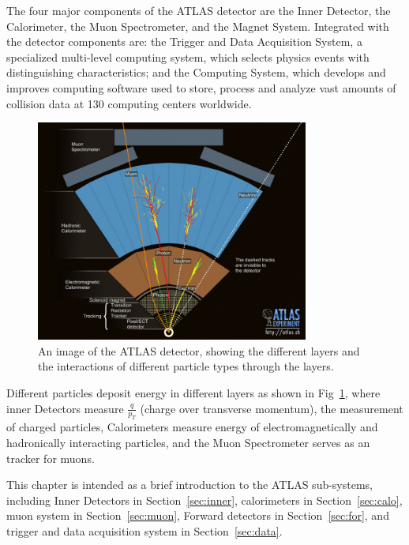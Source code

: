 \par The four major components of the ATLAS detector are the Inner Detector, the Calorimeter, the Muon Spectrometer, and the Magnet System. Integrated with the detector components are: the Trigger and Data Acquisition System, a specialized multi-level computing system, which selects physics events with distinguishing characteristics; and the Computing System, which develops and improves computing software used to store, process and analyze vast amounts of collision data at 130 computing centers worldwide\cite{atlas}.

\begin{figure}[htbp]
    \centering
    \includegraphics[width=0.8\textwidth]{chapters/c4/figures/eve_gen.jpg}
    \caption{An image of the ATLAS detector, showing the different layers and the interactions of different particle types through the layers.}
    \label{fig:eve-gen}
\end{figure}

\par Different particles deposit energy in different layers as shown in Fig~\ref{fig:eve-gen}, where inner Detectors measure $\frac{q}{p_T}$ (charge over transverse momentum), the measurement of charged particles, Calorimeters measure energy of electromagnetically and hadronically interacting particles, and the Muon Spectrometer serves as an tracker for muons.

\par This chapter is intended as a brief introduction to the ATLAS sub-systems, including Inner Detectors in Section~\ref{sec:inner}, calorimeters in Section~\ref{sec:calo}, muon system in Section~\ref{sec:muon}, Forward detectors in Section~\ref{sec:for}, and trigger and data acquisition system in Section~\ref{sec:data}.

